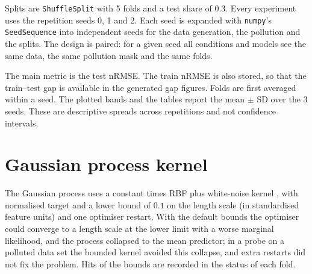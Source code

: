\documentclass{Configuration_Files/PoliMi3i_thesis}
\begin{document}
Splits are \texttt{ShuffleSplit} with 5 folds and a test share of $0.3$. Every experiment uses the repetition seeds 0, 1 and 2. Each seed is expanded with \texttt{numpy}'s \texttt{SeedSequence} into independent seeds for the data generation, the pollution and the splits. The design is paired: for a given seed all conditions and models see the same data, the same pollution mask and the same folds.

The main metric is the test nRMSE. The train nRMSE is also stored, so that the train--test gap is available in the generated gap figures. Folds are first averaged within a seed. The plotted bands and the tables report the mean $\pm$ SD over the 3 seeds. These are descriptive spreads across repetitions and not confidence intervals.

\section{Gaussian process kernel}
\label{sec:gp}%
The Gaussian process uses a constant times RBF plus white-noise kernel \citep{rasmussen2006}, with normalised target and a lower bound of $0.1$ on the length scale (in standardised feature units) and one optimiser restart. With the default bounds the optimiser could converge to a length scale at the lower limit with a worse marginal likelihood, and the process collapsed to the mean predictor; in a probe on a polluted data set the bounded kernel avoided this collapse, and extra restarts did not fix the problem. Hits of the bounds are recorded in the status of each fold.
\end{document}
